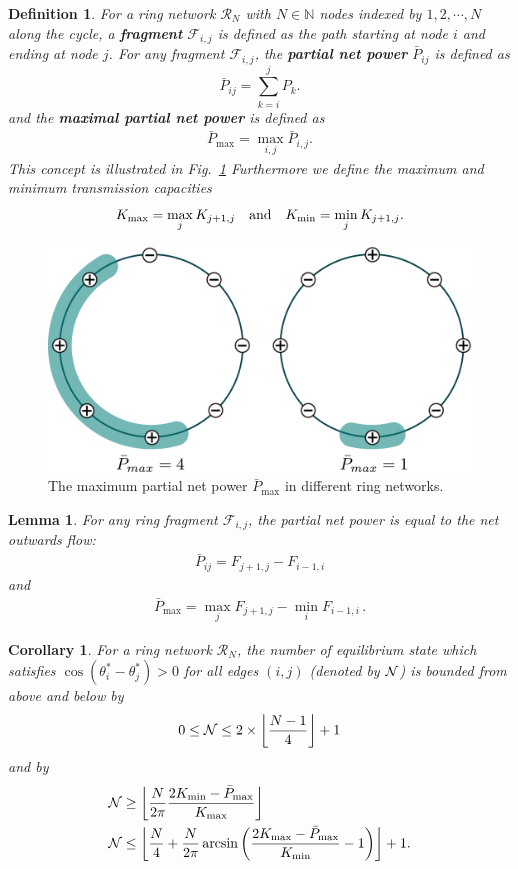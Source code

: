 \documentclass[10pt,aps,pre,preprint,superscriptaddress]{revtex4-1}
\newtheorem{defn}[thm]{Definition}
\newcommand{\be}{\begin{equation}}
\newcommand{\ee}{\end{equation}}
\newcommand{\nn}{\nonumber}
\newcommand{\N}{{\cal N}}
\newcommand{\R}{\mathcal{R}}
\newcommand{\F}{\mathcal{F}}
\newcommand{\floor}[1]{\left\lfloor #1 \right \rfloor}
\newtheorem{lemma}{Lemma}
\newtheorem{corr}{Corollary}
\begin{document}
\begin{defn} 
For a ring network $\R_N$ with $N\in \mathbb{N}$ nodes indexed by $1,2,\cdots,N$
along the cycle, a \textbf{fragment} $\F_{i,j}$ is defined as the path starting at node $i$ 
and ending at node $j$. For any fragment $\F_{i,j}$, the \textbf{partial net power} 
$\bar{P}_{ij}$ is defined as
\be
   \bar{P}_{ij}=\sum_{k=i}^j P_k.  
\ee
and the \textbf{maximal partial net power} is defined as
\begin{align}
  \label{def:mpnp}
   \bar{P}_{\max}=\max_{i,j} \bar{P}_{i,j}.
\end{align}
This concept is illustrated in Fig.~\ref{fig:pmax}
Furthermore we define the maximum and minimum transmission capacities
\be
    K_{\rm max} = \max_{j} K _{j+1,j} 
     \quad \text{and} \quad
    K_{\rm min} = \min_{j} K _{j+1,j}.
\ee
\end{defn}

\begin{figure}[!htp]
\begin{center}
\includegraphics[width=0.6\columnwidth]{pics/pmax_compare}
\end{center}
\caption{
\label{fig:pmax}
  The maximum partial net power $\bar{P}_{\max}$ in different ring networks.
}
\end{figure}

\begin{lemma}
\label{lem:flow-power}
For any ring fragment $\F_{i,j}$, the partial net power is equal to the net outwards flow:
\begin{align}
  \label{eq:glow-power}
  \bar{P}_{ij}=F_{j+1,j}-F_{i-1,i}
\end{align}
and
\begin{align}
   \bar{P}_{\max} = \max_j F_{j+1,j} - \min_{i} F_{i-1,i} \, .
\end{align} 
\end{lemma}


\begin{corr}
\label{corr:hom-ring}
For a ring network $\R_N$, the number of equilibrium state which satisfies 
$\cos(\theta_i^*  - \theta_j^*) > 0$ for all edges $(i,j)$  (denoted by $\N$)
is bounded from above and below by
\begin{align}
   0  \leq \N \leq 2 \times \floor{ \frac{N-1}{4} }  +1 
\end{align}
and by
\begin{align}
   \N & \geq \floor{ \frac{N}{2\pi} 
           \frac{2 K_{\rm min} - \bar P_{\rm max}}{K_{\rm max}} } \nn \\
   \N & \leq \floor{ \frac{N}{4} + \frac{N}{2\pi}
          \arcsin \left(  \frac{2 K_{\rm max} - \bar P_{\rm max}}{K_{\rm min}} -1  \right) }+1.
     \label{eqn:bounds:homring2}      
\end{align}
\end{corr}
\end{document}
